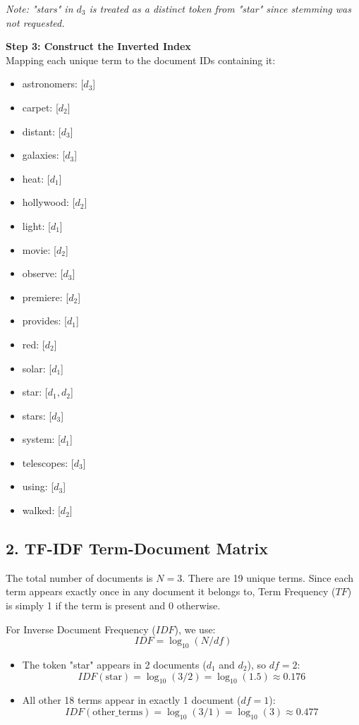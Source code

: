 \documentclass{svproc}
\begin{document}
\textit{Note: "stars" in $d_3$ is treated as a distinct token from "star" since stemming was not requested.}

\textbf{Step 3: Construct the Inverted Index} \\
Mapping each unique term to the document IDs containing it:
\begin{itemize}
    \item astronomers: [$d_3$]
    \item carpet: [$d_2$]
    \item distant: [$d_3$]
    \item galaxies: [$d_3$]
    \item heat: [$d_1$]
    \item hollywood: [$d_2$]
    \item light: [$d_1$]
    \item movie: [$d_2$]
    \item observe: [$d_3$]
    \item premiere: [$d_2$]
    \item provides: [$d_1$]
    \item red: [$d_2$]
    \item solar: [$d_1$]
    \item star: [$d_1, d_2$]
    \item stars: [$d_3$]
    \item system: [$d_1$]
    \item telescopes: [$d_3$]
    \item using: [$d_3$]
    \item walked: [$d_2$]
\end{itemize}

\subsection*{2. TF-IDF Term-Document Matrix}
The total number of documents is $N = 3$. There are 19 unique terms.
Since each term appears exactly once in any document it belongs to, Term Frequency ($TF$) is simply 1 if the term is present and 0 otherwise.

For Inverse Document Frequency ($IDF$), we use:
\[ IDF = \log_{10}(N / df) \]
\begin{itemize}
    \item The token "star" appears in 2 documents ($d_1$ and $d_2$), so $df=2$:
    \[ IDF(\text{star}) = \log_{10}(3 / 2) = \log_{10}(1.5) \approx 0.176 \]
    \item All other 18 terms appear in exactly 1 document ($df=1$):
    \[ IDF(\text{other\_terms}) = \log_{10}(3 / 1) = \log_{10}(3) \approx 0.477 \]
\end{itemize}
\end{document}
